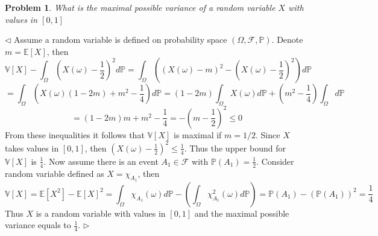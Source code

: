 \documentclass[12pt]{article}
\newtheorem{problem}{Problem}[subsection]
\newenvironment{solution}{\par $\triangleleft$}{$\triangleright$}
\begin{document}
\begin{problem} What is the maximal possible variance of a random variable $X$ with values in $[0,1]$
\end{problem}
\begin{solution} Assume a random variable is defined on probability space $(\Omega,\mathcal{F},\mathbb{P})$. Denote $m=\mathbb{E}[X]$, then
$$
\mathbb{V}[X]-\int_{\Omega}\left(X(\omega)-\frac{1}{2}\right)^2d\mathbb{P}
=\int_{\Omega}\left(\left(X(\omega)-m\right)^2-\left(X(\omega)-\frac{1}{2}\right)^2\right)d\mathbb{P}
$$
$$
=\int_{\Omega}\left(X(\omega)(1-2m)+m^2-\frac{1}{4}\right)d\mathbb{P}
=(1-2m)\int_{\Omega}X(\omega)d\mathbb{P}+\left(m^2-\frac{1}{4}\right)\int_{\Omega}d\mathbb{P}
$$
$$
=(1-2m)m+m^2-\frac{1}{4}=-\left(m-\frac{1}{2}\right)^2\leq 0
$$
From these inequalities it follows that $\mathbb{V}[X]$ is maximal if $m=1/2$. Since $X$ takes values in $[0,1]$, then $\left(X(\omega)-\frac{1}{2}\right)^2\leq \frac{1}{4}$. Thus the upper bound for $\mathbb{V}[X]$ is $\frac{1}{4}$. Now assume there is an event $A_1\in\mathcal{F}$ with $\mathbb{P}(A_1)=\frac{1}{2}$. Consider random variable defined as $X=\chi_{A_1}$, then 
$$
\mathbb{V}[X]
=\mathbb{E}[X^2]-\mathbb{E}[X]^2
=\int_{\Omega}\chi_{A_1}(\omega)d\mathbb{P}-\left(\int_{\Omega}\chi_{A_1}^2(\omega)d\mathbb{P}\right)
=\mathbb{P}(A_1)-(\mathbb{P}(A_1))^2
=\frac{1}{4}
$$
Thus $X$ is a random variable with values in $[0,1]$ and the maximal possible variance equals to $\frac{1}{4}$.
\end{solution}
 
\end{document}
